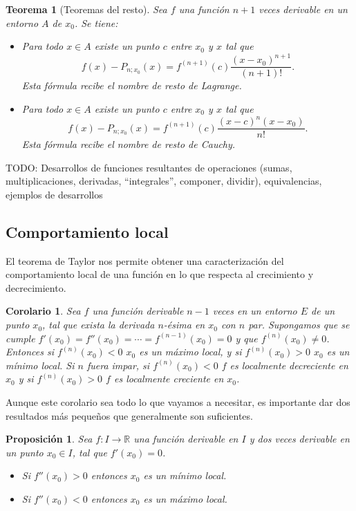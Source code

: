 \documentclass{article}
\newtheorem{theorem}{Teorema}
\newtheorem{prop}{Proposición}
\newtheorem{cor}{Corolario}
\newcommand{\reales}{\mathbb{R}}
\begin{document}
\begin{theorem}[Teoremas del resto]
	Sea $f$ una función $n+1$ veces derivable en un entorno $A$ de $x_0$. Se tiene:
	\begin{itemize}
		\item
		Para todo $x \in A$ existe un punto $c$ entre $x_0$ y $x$ tal que
		\begin{equation*}
			f(x) - P_{n;x_0}(x) = f^{(n+1)}(c)\frac{(x-x_0)^{n+1}}{(n+1)!}.
		\end{equation*}
		Esta fórmula recibe el nombre de resto de Lagrange.		
		
		\item
		Para todo $x \in A$ existe un punto $c$ entre $x_0$ y $x$ tal que
		\begin{equation*}
			f(x) - P_{n;x_0}(x) = f^{(n+1)}(c)\frac{(x-c)^n (x-x_0)}{n!}.
		\end{equation*}
		Esta fórmula recibe el nombre de resto de Cauchy.
	\end{itemize}
\end{theorem}

TODO: Desarrollos de funciones resultantes de operaciones (sumas, multiplicaciones, derivadas, ``integrales'', componer, dividir), equivalencias, ejemplos de desarrollos

\subsection{Comportamiento local}

El teorema de Taylor nos permite obtener una caracterización del comportamiento local de una función en lo que respecta al crecimiento y decrecimiento.

\begin{cor}
	Sea $f$ una función derivable $n-1$ veces en un entorno $E$ de un punto $x_0$, tal que exista la derivada $n$-ésima en $x_0$ con $n$ par. Supongamos que se cumple $f'(x_0) = f''(x_0) = \cdots = f^{(n-1)}(x_0) = 0$ y que $f^{(n)}(x_0) \neq 0$. Entonces si $f^{(n)}(x_0) < 0$ $x_0$ es un máximo local, y si $f^{(n)}(x_0) > 0$ $x_0$ es un mínimo local. Si $n$ fuera impar, si $f^{(n)}(x_0) < 0$ $f$ es localmente decreciente en $x_0$ y si $f^{(n)}(x_0) > 0$ $f$ es localmente creciente en $x_0$.
\end{cor}

Aunque este corolario sea todo lo que vayamos a necesitar, es importante dar dos resultados más pequeños que generalmente son suficientes.

\begin{prop}
	Sea $f: I \rightarrow \reales$ una función derivable en $I$ y dos veces derivable en un punto $x_0 \in I$, tal que $f'(x_0) = 0$.
	\begin{itemize}
		\item
		Si $f''(x_0) > 0$ entonces $x_0$ es un mínimo local.
	
		\item
		Si $f''(x_0) < 0$ entonces $x_0$ es un máximo local.
	\end{itemize}
\end{prop}
\end{document}
